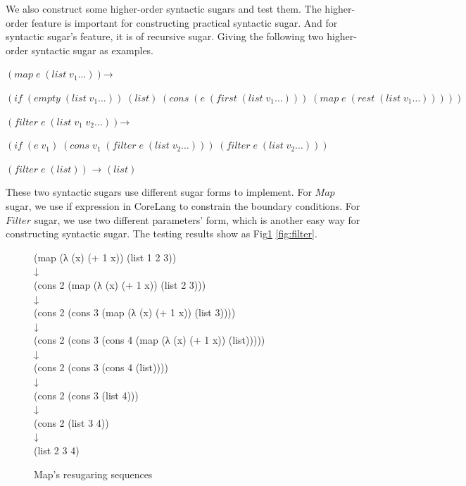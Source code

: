 We also construct some higher-order syntactic sugars and test them. The higher-order feature is important for constructing practical syntactic sugar. And for syntactic sugar's feature, it is of recursive sugar. Giving the following two higher-order syntactic sugar as examples.

\begin{flushleft}
	$(map\;e\;(list\;v_1\ldots))$→
	
	$(if\;(empty\;(list\;v_1\ldots))\;(list)\;(cons\;(e\;(first\;(list\;v_1\ldots)))\;(map\;e\;(rest\;(list\;v_1\ldots)))))$
\end{flushleft}

\begin{flushleft}
	$(filter\;e\;(list\;v_1\;v_2\ldots))$→
	
	$(if\;(e\;v_1)\;(cons\;v_1\;(filter\;e\;(list\;v_2\ldots)))\;(filter\;e\;(list\;v_2\ldots)))$
	
	$(filter\;e\;(list))$ → $(list)$
\end{flushleft}
These two syntactic sugars use different sugar forms to implement. For $Map$ sugar, we use if expression in CoreLang to constrain the boundary conditions. For $Filter$ sugar, we use two different parameters' form, which is another easy way for constructing syntactic sugar. The testing results show as Fig\ref{fig:map} \ref{fig:filter}.

\begin{figure}[ht]
	\centering
	\parbox[t]{\textwidth}{
				\begin{center}
				{
					\small\selectfont
					(map (λ (x) (+ 1 x)) (list 1 2 3))\\
					↓\\
					(cons 2 (map (λ (x) (+ 1 x)) (list 2 3)))\\
					↓\\
					(cons 2 (cons 3 (map (λ (x) (+ 1 x)) (list 3))))\\
					↓\\
					(cons 2 (cons 3 (cons 4 (map (λ (x) (+ 1 x)) (list)))))\\
					↓\\
					(cons 2 (cons 3 (cons 4 (list))))\\
					↓\\
					(cons 2 (cons 3 (list 4)))\\
					↓\\
					(cons 2 (list 3 4))\\
					↓\\
					(list 2 3 4)
				}
				\end{center}
				
			}
	\caption{Map's resugaring sequences}
\label{fig:map}
\end{figure}

